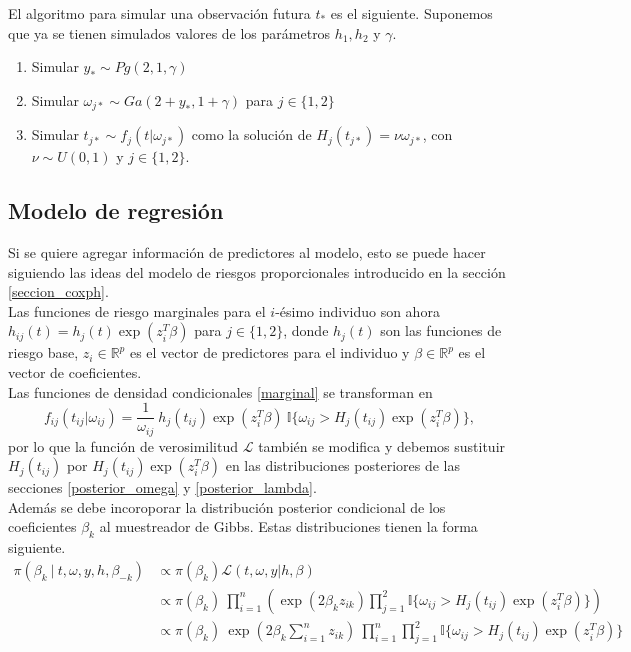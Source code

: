 \documentclass[11pt,a4paper]{article}
\begin{document}
El algoritmo para simular una observación futura $t_*$ es el siguiente. Suponemos que ya se tienen simulados valores de los parámetros $h_1, h_2$ y $\gamma$.
\begin{enumerate}
\item Simular $y_* \sim Pg(2, 1, \gamma)$
\item Simular $\omega_{j*} \sim Ga(2 + y_*, 1 + \gamma)$ para $j\in \lbrace 1, 2 \rbrace$
\item Simular $t_{j*} \sim f_j(t|\omega_{j*})$ como la solución de $H_j(t_{j*}) = \nu \omega_{j*}$, con $\nu \sim U(0, 1)$ y $j\in \lbrace 1, 2 \rbrace$.\\
\end{enumerate}

\subsection{Modelo de regresión}

Si se quiere agregar información de predictores al modelo, esto se puede hacer siguiendo las ideas del modelo de riesgos proporcionales introducido en la sección \ref{seccion_coxph}.\\

Las funciones de riesgo marginales para el $i$-ésimo individuo son ahora $h_{ij}(t) = h_j(t)\exp (z_i^T\beta)$ para $j\in \lbrace 1, 2 \rbrace$, donde $h_j(t)$ son las funciones de riesgo base, $z_i \in \mathbb{R}^p$ es el vector de predictores para el individuo y $\beta\in \mathbb{R}^p$ es el vector de coeficientes.\\

Las funciones de densidad condicionales \eqref{marginal} se transforman en
$$f_{ij}(t_{ij} | \omega_{ij}) = \frac{1}{\omega_{ij}} \ h_j(t_{ij})\exp (z_i^T\beta) \ \mathbb{I}\lbrace \omega_{ij} > H_j(t_{ij})\exp (z_i^T\beta) \rbrace,$$ por lo que la función de verosimilitud $\mathcal{L}$ también se modifica y debemos sustituir $H_j(t_{ij})$ por $H_j(t_{ij}) \exp (z_i^T\beta)$ en las distribuciones posteriores de las secciones \ref{posterior_omega} y \ref{posterior_lambda}.\\

Además se debe incoroporar la distribución posterior condicional de los coeficientes $\beta_k$ al muestreador de Gibbs. Estas distribuciones tienen la forma siguiente.\\

\begin{align*}
\pi(\beta_k \ | \ t, \omega, y, h, \beta_{-k}) &\propto \pi(\beta_k) \mathcal{L}(t, \omega, y | h, \beta)\\
&\propto \pi(\beta_k) \ \prod_{i=1}^n \left( \exp (2\beta_k z_{ik}) \prod_{j=1}^2 \mathbb{I}\lbrace \omega_{ij} > H_j(t_{ij})\exp (z_i^T\beta) \rbrace \right)\\
&\propto \pi(\beta_k) \ \exp\left( 2\beta_k \sum_{i=1}^n z_{ik}\right) \ \prod_{i=1}^n\prod_{j=1}^2 \mathbb{I}\lbrace \omega_{ij} > H_j(t_{ij})\exp (z_i^T\beta) \rbrace
\end{align*}
\end{document}
